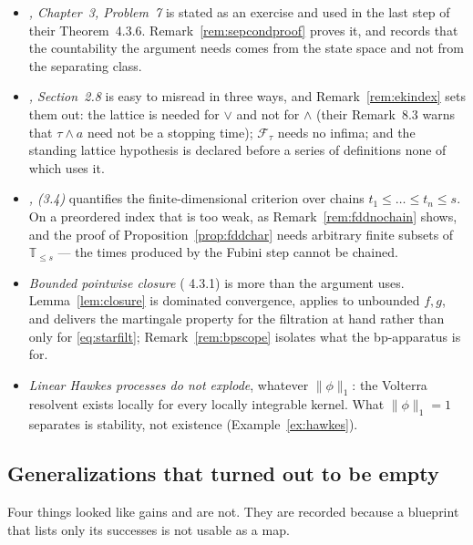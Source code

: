 \documentclass[11pt,a4paper]{article}
\theoremstyle{plain}
\theoremstyle{definition}
\theoremstyle{remark}
\newcommand{\T}{\mathbb{T}}                     %
\newcommand{\Filt}{\mathcal{F}}
\newcommand{\EK}{\cite{EK86}}
\begin{document}
\begin{itemize}
\item \emph{\EK, Chapter~3, Problem~7} is stated as an exercise and used in the
  last step of their Theorem~4.3.6.  Remark~\ref{rem:sepcondproof} proves it, and
  records that the countability the argument needs comes from the state space and
  not from the separating class.
\item \emph{\EK, Section~2.8} is easy to misread in three ways, and
  Remark~\ref{rem:ekindex} sets them out: the lattice is needed for $\vee$ and
  not for $\wedge$ (their Remark~8.3 warns that $\tau \wedge a$ need not be a
  stopping time); $\Filt_\tau$ needs no infima; and the standing lattice
  hypothesis is declared before a series of definitions none of which uses it.
\item \emph{\EK, (3.4)} quantifies the finite-dimensional criterion over chains
  $t_1 \leq \dots \leq t_n \leq s$.  On a preordered index that is too weak, as
  Remark~\ref{rem:fddnochain} shows, and the proof of
  Proposition~\ref{prop:fddchar} needs arbitrary finite subsets of $\T_{\leq s}$ ---
  the times produced by the Fubini step cannot be chained.
\item \emph{Bounded pointwise closure} (\EK{} 4.3.1) is more than the argument
  uses.  Lemma~\ref{lem:closure} is dominated convergence, applies to unbounded
  $f,g$, and delivers the martingale property for the filtration at hand rather
  than only for \eqref{eq:starfilt}; Remark~\ref{rem:bpscope} isolates what the
  bp-apparatus is for.
\item \emph{Linear Hawkes processes do not explode}, whatever
  $\lVert\phi\rVert_1$: the Volterra resolvent exists locally for every locally
  integrable kernel.  What $\lVert\phi\rVert_1 = 1$ separates is stability, not
  existence (Example~\ref{ex:hawkes}).
\end{itemize}

\subsection{Generalizations that turned out to be empty}
\label{ssec:addednothing}

Four things looked like gains and are not.  They are recorded because a
blueprint that lists only its successes is not usable as a map.
\end{document}

